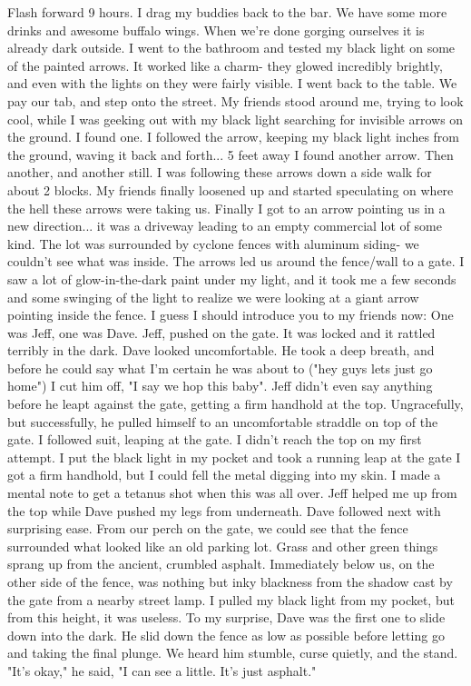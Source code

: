\documentclass[a4paper]{article}
\begin{document}
Flash forward 9 hours. I drag my buddies back to the bar. We have some more drinks and awesome buffalo wings. When we're done gorging ourselves it is already dark outside.
I went to the bathroom and tested my black light on some of the painted arrows. It worked like a charm- they glowed incredibly brightly, and even with the lights on they were fairly visible.
I went back to the table. We pay our tab, and step onto the street.
My friends stood around me, trying to look cool, while I was geeking out with my black light searching for invisible arrows on the ground. I found one.
I followed the arrow, keeping my black light inches from the ground, waving it back and forth... 5 feet away I found another arrow. Then another, and another still.
I was following these arrows down a side walk for about 2 blocks. My friends finally loosened up and started speculating on where the hell these arrows were taking us.
Finally I got to an arrow pointing us in a new direction... it was a driveway leading to an empty commercial lot of some kind. The lot was surrounded by cyclone fences with aluminum siding- we couldn't see what was inside.
The arrows led us around the fence/wall to a gate.
I saw a lot of glow-in-the-dark paint under my light, and it took me a few seconds and some swinging of the light to realize we were looking at a giant arrow pointing inside the fence.
I guess I should introduce you to my friends now: One was Jeff, one was Dave.
Jeff, pushed on the gate. It was locked and it rattled terribly in the dark. Dave looked uncomfortable. He took a deep breath, and before he could say what I'm certain he was about to ("hey guys lets just go home") I cut him off, "I say we hop this baby".
Jeff didn't even say anything before he leapt against the gate, getting a firm handhold at the top. Ungracefully, but successfully, he pulled himself to an uncomfortable straddle on top of the gate.
I followed suit, leaping at the gate. I didn't reach the top on my first attempt. I put the black light in my pocket and took a running leap at the gate I got a firm handhold, but I could fell the metal digging into my skin. I made a mental note to get a tetanus shot when this was all over.
Jeff helped me up from the top while Dave pushed my legs from underneath. Dave followed next with surprising ease.
From our perch on the gate, we could see that the fence surrounded what looked like an old parking lot. Grass and other green things sprang up from the ancient, crumbled asphalt.
Immediately below us, on the other side of the fence, was nothing but inky blackness from the shadow cast by the gate from a nearby street lamp. I pulled my black light from my pocket, but from this height, it was useless.
To my surprise, Dave was the first one to slide down into the dark. He slid down the fence as low as possible before letting go and taking the final plunge. We heard him stumble, curse quietly, and the stand.
"It's okay," he said, "I can see a little. It's just asphalt."
\end{document}

